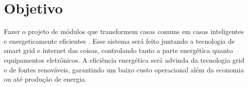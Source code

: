 \chapter[Objetivo]{Objetivo}

    \par Fazer o projeto de módulos que transformem casas comuns em casas inteligentes e energeticamente eficientes . Esse sistema será feito juntando a tecnologia de smart grid e internet das coisas, controlando tanto a parte  energética quanto  equipamentos eletrônicos. A eficiência energética será advinda da  tecnologia grid e de fontes renováveis, garantindo um baixo custo operacional além da economia ou até produção de energia.

